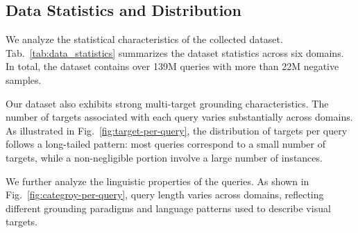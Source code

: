 \documentclass{llmxive}
\begin{document}
\subsection{Data Statistics and Distribution}
We analyze the statistical characteristics of the collected dataset.
Tab.~\ref{tab:data_statistics} summarizes the dataset statistics across six domains. 
In total, the dataset contains over 139M queries with more than 22M negative samples. 

Our dataset also exhibits strong multi-target grounding characteristics. 
The number of targets associated with each query varies substantially across domains. 
As illustrated in Fig.~\ref{fig:target-per-query}, the distribution of targets per query follows a long-tailed pattern: most queries correspond to a small number of targets, while a non-negligible portion involve a large number of instances.

We further analyze the linguistic properties of the queries. 
As shown in Fig.~\ref{fig:categroy-per-query}, query length varies across domains, reflecting different grounding paradigms and language patterns used to describe visual targets.
\end{document}
